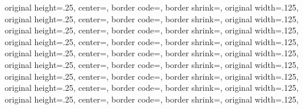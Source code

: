 {{	original height=.25\pgfpageoptionwidth,%
	center=\pgfpoint{.5\pgfphysicalwidth}{.5\pgfphysicalheight},%
	border code=\pgfsetlinewidth{.5pt}\pgfstroke,%
	}%
  {%
	border shrink=\pgfpageoptionborder,%
	original width=.125\pgfpageoptionheight,%
	original height=.25\pgfpageoptionwidth,%
	center=\pgfpoint{.25\pgfphysicalwidth}{.5\pgfphysicalheight},%
	border code=\pgfsetlinewidth{.5pt}\pgfstroke,%
  }%
  {%
	border shrink=\pgfpageoptionborder,%
	original width=.125\pgfpageoptionheight,%
	original height=.25\pgfpageoptionwidth,%
	center=\pgfpoint{0pt}{.5\pgfphysicalheight},%
	border code=\pgfsetlinewidth{.5pt}\pgfstroke,%
  }%
  {%
	border shrink=\pgfpageoptionborder,%
	original width=.125\pgfpageoptionheight,%
	original height=.25\pgfpageoptionwidth,%
	center=\pgfpoint{.75\pgfphysicalwidth}{.375\pgfphysicalheight},%
	border code=\pgfsetlinewidth{.5pt}\pgfstroke,%
  }%
  {%
	border shrink=\pgfpageoptionborder,%
	original width=.125\pgfpageoptionheight,%
	original height=.25\pgfpageoptionwidth,%
	center=\pgfpoint{.5\pgfphysicalwidth}{.375\pgfphysicalheight},%
	border code=\pgfsetlinewidth{.5pt}\pgfstroke,%
	}%
  {%
	border shrink=\pgfpageoptionborder,%
	original width=.125\pgfpageoptionheight,%
	original height=.25\pgfpageoptionwidth,%
	center=\pgfpoint{.25\pgfphysicalwidth}{.375\pgfphysicalheight},%
	border code=\pgfsetlinewidth{.5pt}\pgfstroke,%
  }%
  {%
	border shrink=\pgfpageoptionborder,%
	original width=.125\pgfpageoptionheight,%
	original height=.25\pgfpageoptionwidth,%
	center=\pgfpoint{0pt}{.375\pgfphysicalheight},%
	border code=\pgfsetlinewidth{.5pt}\pgfstroke,%
  }%
  {%
	border shrink=\pgfpageoptionborder,%
	original width=.125\pgfpageoptionheight,%
	original height=.25\pgfpageoptionwidth,%
	center=\pgfpoint{.75\pgfphysicalwidth}{.25\pgfphysicalheight},%
	border code=\pgfsetlinewidth{.5pt}\pgfstroke,%
  }%
  {%
	border shrink=\pgfpageoptionborder,%
	original width=.125\pgfpageoptionheight,%
	original height=.25\pgfpageoptionwidth,%
	center=\pgfpoint{.5\pgfphysicalwidth}{.25\pgfphysicalheight},%
	border code=\pgfsetlinewidth{.5pt}\pgfstroke,%
	}%
  {%
	border shrink=\pgfpageoptionborder,%
	original width=.125\pgfpageoptionheight,%
}}
